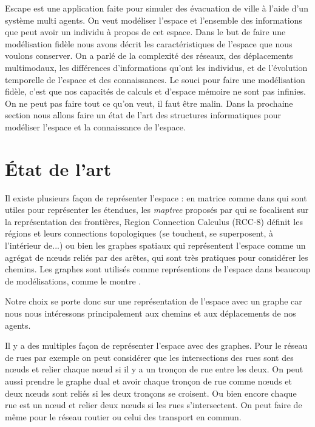 \documentclass[a4paper]{article}
\newcommand{\comment}[1]{}
\begin{document}
Escape est une application faite pour simuler des évacuation de ville à l'aide
d'un  système multi agents. On veut modéliser l'espace et l'ensemble des
informations que peut avoir un individu à propos de cet espace. Dans le but de
faire une modélisation fidèle nous avons décrit les caractéristiques de l'espace
que nous voulons conserver. On a parlé de la complexité des réseaux, des
déplacements multimodaux, les différences d'informations qu'ont les individus,
et de l'évolution temporelle de l'espace et des connaissances. Le souci pour
faire une modélisation fidèle, c'est que nos capacités de calculs et d'espace
mémoire ne sont pas infinies. On ne peut pas faire tout ce qu'on veut, il faut
être malin. Dans la prochaine section nous allons faire un état de l'art des
structures informatiques pour modéliser l'espace et la connaissance de l'espace.

\section{État de l'art}
\label{etat}

Il existe plusieurs façon de représenter l'espace : en matrice comme dans
\cite{batty1999} qui sont utiles pour représenter les étendues, les
\emph{maptree} proposés par \cite{worboys2012} qui se focalisent sur la
représentation des frontières, Region Connection Calculus (RCC-8)
\cite{randell1992} définit les régions et leurs connections topologiques (se
touchent, se superposent, à l'intérieur de...) ou bien les graphes spatiaux qui
représentent l'espace comme un agrégat de nœuds reliés par des arêtes, qui sont
très pratiques pour considérer les chemins. Les graphes sont utilisés comme
représentions de l'espace dans beaucoup de modélisations, comme le montre
\cite{dale2010}.

Notre choix se porte donc sur une représentation de l'espace avec un graphe car
nous nous intéressons principalement aux chemins et aux déplacements de nos
agents.

Il y a des multiples façon de représenter l'espace avec des graphes. Pour le
réseau de rues par exemple on peut considérer que les intersections des rues
sont des nœuds et relier chaque nœud si il y a un tronçon de rue entre les
deux.\comment{Ajouter un référence} On peut aussi prendre le graphe dual et
avoir chaque tronçon de rue comme nœuds et deux nœuds sont reliés si les deux
tronçons se croisent. Ou bien encore chaque rue est un nœud et relier deux nœuds
si les rues s'intersectent. On peut faire de même pour le réseau routier ou
celui des transport en commun.
\end{document}
